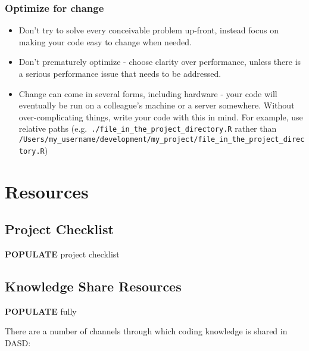 \documentclass[]{book}
\providecommand{\tightlist}{%
  \setlength{\itemsep}{0pt}\setlength{\parskip}{0pt}}
\begin{document}
\hypertarget{change}{%
\section{Optimize for change}\label{change}}

\begin{itemize}
\tightlist
\item
  Don't try to solve every conceivable problem up-front, instead focus on making your code easy to change when needed.
\item
  Don't prematurely optimize - choose clarity over performance, unless there is a serious performance issue that needs to be addressed.
\item
  Change can come in several forms, including hardware - your code will eventually be run on a colleague's machine or a server somewhere. Without over-complicating things, write your code with this in mind. For example, use relative paths (e.g.~\texttt{./file\_in\_the\_project\_directory.R} rather than \texttt{/Users/my\_username/development/my\_project/file\_in\_the\_project\_directory.R})
\end{itemize}

\hypertarget{resources}{%
\part{Resources}\label{resources}}

\hypertarget{checklist}{%
\chapter{Project Checklist}\label{checklist}}

\textbf{POPULATE} project checklist

\hypertarget{ksresources}{%
\chapter{Knowledge Share Resources}\label{ksresources}}

\textbf{POPULATE} fully

There are a number of channels through which coding knowledge is shared in DASD:
\end{document}
